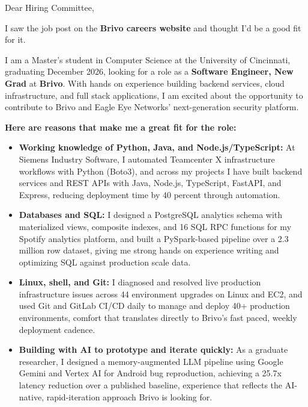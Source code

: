 \documentclass[11pt]{letter}
\date{}
\begin{document}
\begin{letter}{}

\opening{Dear Hiring Committee,}

I saw the job post on the \textbf{Brivo careers website} and thought I'd be a good fit for it.

I am a Master's student in Computer Science at the University of Cincinnati, graduating December 2026, looking for a role as a \textbf{Software Engineer, New Grad} at \textbf{Brivo}. With hands on experience building backend services, cloud infrastructure, and full stack applications, I am excited about the opportunity to contribute to Brivo and Eagle Eye Networks' next-generation security platform.

\textbf{Here are reasons that make me a great fit for the role:}

\begin{itemize}[leftmargin=*, itemsep=0.45em]
    \item \textbf{Working knowledge of Python, Java, and Node.js/TypeScript:} At Siemens Industry Software, I automated Teamcenter X infrastructure workflows with Python (Boto3), and across my projects I have built backend services and REST APIs with Java, Node.js, TypeScript, FastAPI, and Express, reducing deployment time by 40 percent through automation.

    \item \textbf{Databases and SQL:} I designed a PostgreSQL analytics schema with materialized views, composite indexes, and 16 SQL RPC functions for my Spotify analytics platform, and built a PySpark-based pipeline over a 2.3 million row dataset, giving me strong hands on experience writing and optimizing SQL against production scale data.

    \item \textbf{Linux, shell, and Git:} I diagnosed and resolved live production infrastructure issues across 44 environment upgrades on Linux and EC2, and used Git and GitLab CI/CD daily to manage and deploy 40+ production environments, comfort that translates directly to Brivo's fast paced, weekly deployment cadence.

    \item \textbf{Building with AI to prototype and iterate quickly:} As a graduate researcher, I designed a memory-augmented LLM pipeline using Google Gemini and Vertex AI for Android bug reproduction, achieving a 25.7x latency reduction over a published baseline, experience that reflects the AI-native, rapid-iteration approach Brivo is looking for.


\end{itemize}
\end{letter}
\end{document}
